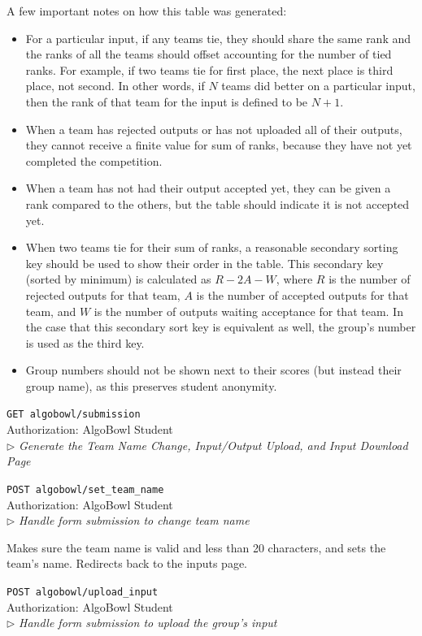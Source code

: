 \documentclass[12pt]{article}
\newcommand\ctrltitle[1]{\par\medskip\texttt{\large #1}\\}
\newcommand\ctrlauth[1]{Authorization: #1\\}
\newcommand\ctrldesc[1]{$\rhd$ \textsl{#1}\par\medskip}
\begin{document}
A few important notes on how this table was generated:

\begin{itemize}
    \item For a particular input, if any teams tie, they should share the same
        rank and the ranks of all the teams should offset accounting for the
        number of tied ranks. For example, if two teams tie for first place,
        the next place is third place, not second. In other words, if $N$ teams
        did better on a particular input, then the rank of that team for the
        input is defined to be $N + 1$.
    \item When a team has rejected outputs or has not uploaded all of their
        outputs, they cannot receive a finite value for sum of ranks, because
        they have not yet completed the competition.
    \item When a team has not had their output accepted yet, they can be given
        a rank compared to the others, but the table should indicate it is not
        accepted yet.
    \item When two teams tie for their sum of ranks, a reasonable secondary
        sorting key should be used to show their order in the table. This
        secondary key (sorted by minimum) is calculated as $R - 2A - W$, where $R$
        is the number of rejected outputs for that team, $A$ is the number of
        accepted outputs for that team, and $W$ is the number of outputs
        waiting acceptance for that team. In the case that this secondary sort
        key is equivalent as well, the group's number is used as the third key.
    \item Group numbers should not be shown next to their scores (but instead
        their group name), as this preserves student anonymity.
\end{itemize}

\ctrltitle{GET algobowl/submission}
\ctrlauth{AlgoBowl Student}
\ctrldesc{Generate the Team Name Change, Input/Output Upload, and Input Download Page}

\ctrltitle{POST algobowl/set\_team\_name}
\ctrlauth{AlgoBowl Student}
\ctrldesc{Handle form submission to change team name}

Makes sure the team name is valid and less than 20 characters, and sets the
team's name. Redirects back to the inputs page.

\ctrltitle{POST algobowl/upload\_input}
\ctrlauth{AlgoBowl Student}
\ctrldesc{Handle form submission to upload the group's input}
\end{document}
